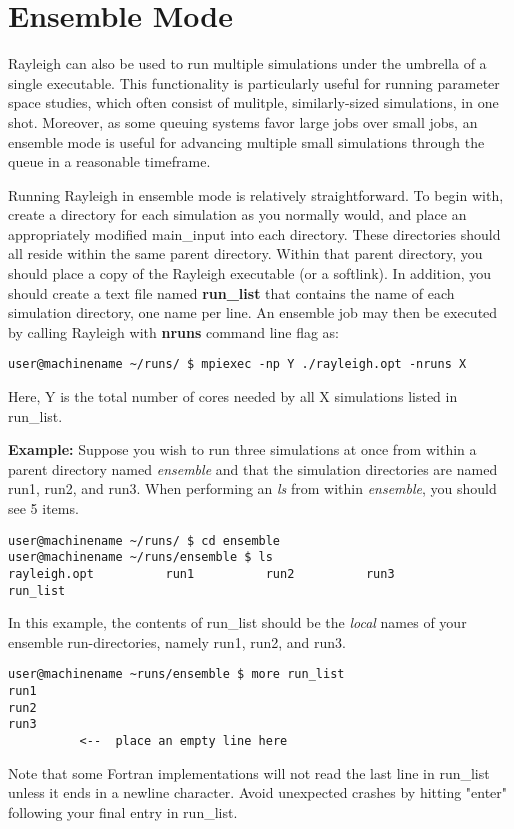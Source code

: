 \clearpage
\section{Ensemble Mode}
Rayleigh can also be used to run multiple simulations under the umbrella of a single executable.  This functionality is particularly useful for running parameter space studies, which often consist of mulitple, similarly-sized simulations, in one shot.  Moreover, as some queuing systems favor large jobs over small jobs, an ensemble mode is useful for advancing multiple small simulations through the queue in a reasonable timeframe. 

 
Running Rayleigh in ensemble mode is relatively straightforward.  To begin with, create a directory for each simulation as you normally would, and place an appropriately modified main\_input into each directory.  These directories should all reside within the same parent directory.  Within that parent directory, you should place a copy of the Rayleigh executable (or a softlink).  In addition, you should create a text file named \textbf{run\_list} that contains the name of each simulation directory, one name per line.  An ensemble job may then be executed by calling Rayleigh with \textbf{nruns} command line flag as:

\begin{lstlisting}
user@machinename ~/runs/ $ mpiexec -np Y ./rayleigh.opt -nruns X
\end{lstlisting}

Here, Y is the total number of cores needed by all X simulations listed in run\_list.
     
\textbf{Example:}
Suppose you wish to run three simulations at once from within a parent directory named \textit{ensemble} and that the simulation directories are named run1, run2, and run3.    When performing an \textit{ls} from within \textit{ensemble}, you should see 5 items.

\begin{lstlisting}
user@machinename ~/runs/ $ cd ensemble
user@machinename ~/runs/ensemble $ ls
rayleigh.opt          run1          run2          run3          run_list
\end{lstlisting}
In this example, the contents of run\_list should be the \textit{local} names of your ensemble run-directories, namely run1, run2, and run3.

\begin{lstlisting}
user@machinename ~runs/ensemble $ more run_list 
run1
run2
run3
          <--  place an empty line here
\end{lstlisting}
Note that some Fortran implementations will not read the last line in run\_list unless it ends in a newline character.  Avoid unexpected crashes by hitting "enter" following your final entry in run\_list.  

